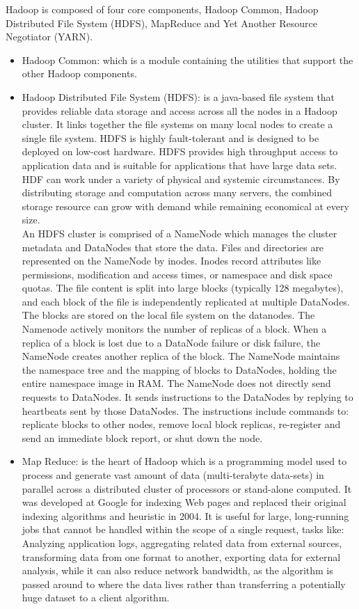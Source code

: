 \documentclass[10pt, conference]{IEEEtran}
\begin{document}
\indent Hadoop is composed of four core components, Hadoop Common, Hadoop Distributed File System (HDFS), MapReduce and Yet Another Resource Negotiator (YARN).
\begin{itemize}
\item Hadoop Common: which is a module containing the utilities that support the other Hadoop components.\\
\item Hadoop Distributed File System (HDFS): is a java-based file system that provides reliable data storage and access across all the nodes in a Hadoop cluster. It links together the file systems on many local nodes to create a single file system. HDFS is highly fault-tolerant and is designed to be deployed on low-cost hardware. HDFS provides high throughput access to application data and is suitable for applications that have large data sets. HDF can work under a variety of physical and systemic circumstances. By distributing storage and computation across many servers, the combined storage resource can grow with demand while remaining economical at every size.\\
\indent An HDFS cluster is comprised of a NameNode which manages the cluster metadata and DataNodes that store the data. Files and directories are represented on the NameNode by inodes. Inodes record attributes like permissions, modification and access times, or namespace and disk space quotas. The file content is split into large blocks (typically 128 megabytes), and each block of the file is independently replicated at multiple DataNodes. The blocks are stored on the local file system on the datanodes. The Namenode actively monitors the number of replicas of a block. When a replica of a block is lost due to a DataNode failure or disk failure, the NameNode creates another replica of the block. The NameNode maintains the namespace tree and the mapping of blocks to DataNodes, holding the entire namespace image in RAM. The NameNode does not directly send requests to DataNodes. It sends instructions to the DataNodes by replying to heartbeats sent by those DataNodes. The instructions include commands to: replicate blocks to other nodes, remove local block replicas, re-register and send an immediate block report, or shut down the node.\\
\item Map Reduce: is the heart of Hadoop which is a programming model used to process and generate vast amount of data (multi-terabyte data-sets) in parallel across a distributed cluster of processors or stand-alone computed. It was developed at Google for indexing Web pages and replaced their original indexing algorithms and heuristic in 2004. It is useful for large, long-running jobs that cannot be handled within the scope of a single request, tasks like: Analyzing application logs, aggregating related data from external sources, transforming data from one format to another, exporting data for external analysis, while it can also reduce network bandwidth, as the algorithm is passed around to where the data lives rather than transferring a potentially huge dataset to a client algorithm.\\

\end{itemize}
\end{document}
